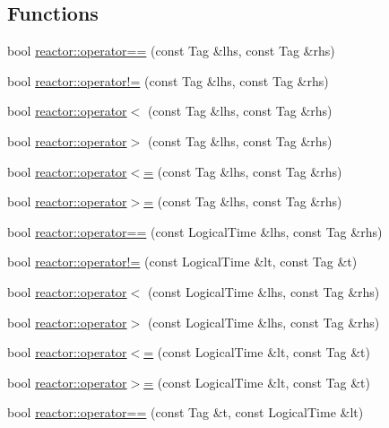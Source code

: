 \subsection*{Functions}
\begin{DoxyCompactItemize}
\item 
bool \hyperlink{namespacereactor_a0c98d4882f478da43c2c1a169a1fedd2}{reactor\+::operator==} (const Tag \&lhs, const Tag \&rhs)
\item 
bool \hyperlink{namespacereactor_a550a07297e731136c8d7570395c5128d}{reactor\+::operator!=} (const Tag \&lhs, const Tag \&rhs)
\item 
bool \hyperlink{namespacereactor_a92dbf562adb06209a1f5632d5e2a0155}{reactor\+::operator$<$} (const Tag \&lhs, const Tag \&rhs)
\item 
bool \hyperlink{namespacereactor_a2e90ae0e79dfde9f7fbeb54d66a1e3a8}{reactor\+::operator$>$} (const Tag \&lhs, const Tag \&rhs)
\item 
bool \hyperlink{namespacereactor_adb763d87ec4b89428e75916a5150da36}{reactor\+::operator$<$=} (const Tag \&lhs, const Tag \&rhs)
\item 
bool \hyperlink{namespacereactor_a33339cac3268e44879ed753a397aec99}{reactor\+::operator$>$=} (const Tag \&lhs, const Tag \&rhs)
\item 
bool \hyperlink{namespacereactor_a55f3e1662b62c0347fb588c294b3f471}{reactor\+::operator==} (const Logical\+Time \&lhs, const Tag \&rhs)
\item 
bool \hyperlink{namespacereactor_a127aac66cd5fa1913c6756d46be9d817}{reactor\+::operator!=} (const Logical\+Time \&lt, const Tag \&t)
\item 
bool \hyperlink{namespacereactor_a632f1427effbba727fcb9f5aa38d6e03}{reactor\+::operator$<$} (const Logical\+Time \&lhs, const Tag \&rhs)
\item 
bool \hyperlink{namespacereactor_ae9b630f4a987aba9a98c138dd23e87b5}{reactor\+::operator$>$} (const Logical\+Time \&lhs, const Tag \&rhs)
\item 
bool \hyperlink{namespacereactor_a601c2be55dc826bea9a245045613ccc5}{reactor\+::operator$<$=} (const Logical\+Time \&lt, const Tag \&t)
\item 
bool \hyperlink{namespacereactor_aba36ee73a806348027f3a8468faa0dc4}{reactor\+::operator$>$=} (const Logical\+Time \&lt, const Tag \&t)
\item 
bool \hyperlink{namespacereactor_a97c015047b9fb102d5b41e244da88917}{reactor\+::operator==} (const Tag \&t, const Logical\+Time \&lt)
\item 

\end{DoxyCompactItemize}
